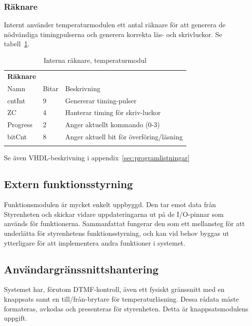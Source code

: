 \documentclass[a4paper,11pt]{article}
\begin{document}
	\subsubsection{Räknare}
	
	Internt använder temperaturmodulen ett antal räknare för att generera de nödvändiga timingpulserna och generera korrekta läs- och skrivluckor. Se tabell~\ref{tab:cntTabell}.

	\begin{table} [H]
		
		\caption{Interna räknare, temperaturmodul} 
		\label{tab:cntTabell}
	\begin{tabular}{l l l}
		
		{\bf Räknare}
		\\{Namn} & {Bitar} & {Beskrivning}\\
		\hline
			cntInt & 9 & Genererar timing-pulser\\
			ZC & 4 & Hanterar timing för skriv-luckor\\
			Progress & 2 & Anger aktuellt kommando (0-3)\\
			bitCnt & 8 & Anger aktuell bit för överföring/läsning\\\\
	\end{tabular}
	\end{table}

	Se även VHDL-beskrivning i appendix~\ref{sec:programlistningar}

	\subsection{Extern funktionsstyrning}

Funktionsmodulen är mycket enkelt uppbyggd. Den tar emot data från Styrenheten och skickar vidare 
uppdateringarna ut på de I/O-pinnar som används för funktionerna. Sammanfattat fungerar den som ett
mellansteg för att underlätta för styrenhetens funktionsstyrning, och kan vid behov byggas ut ytterligare
för att implementera andra funktioner i systemet.

	\subsection{Användargränssnittshantering}

Systemet har, förutom DTMF-kontroll, även ett fysiskt gränssnitt med en knappsats samt en till/från-brytare för temperaturläsning.
Dessa rådata måste formateras, avkodas och presenteras för styrenheten. Detta är knappsatsmodulens uppgift.
\end{document}
